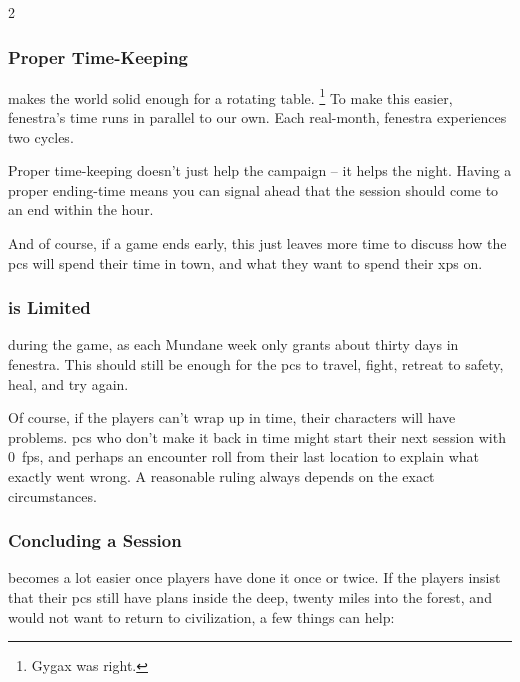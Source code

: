 \begin{multicols}{2}
\subsubsection{Proper Time-Keeping}
makes the world solid enough for a rotating table.%
\footnote{Gygax was right.}
To make this easier, \gls{fenestra}'s time runs in parallel to our own.
Each real-month, \gls{fenestra} experiences two \glspl{cycle}.

Proper time-keeping doesn't just help the \gls{campaign} -- it helps the night.
Having a proper ending-time means you can signal ahead that the session should come to an end within the hour.

And of course, if a game ends early, this just leaves more time to discuss how the \glspl{pc} will spend their time in town, and what they want to spend their \glspl{xp} on.

\subsubsection{ is Limited}
during the game, as each Mundane week only grants about thirty days in \gls{fenestra}.
This should still be enough for the \glspl{pc} to travel, fight, retreat to safety, heal, and try again.

Of course, if the players can't wrap up in time, their characters will have problems.
\Glspl{pc} who don't make it back in time might start their next session with 0~\glspl{fp}, and perhaps an encounter roll from their last location to explain what exactly went wrong.
A reasonable ruling always depends on the exact circumstances.

\subsubsection{Concluding a Session}
becomes a lot easier once players have done it once or twice.
If the players insist that their \glspl{pc} still have plans inside the \gls{deep}, twenty miles into the forest, and would not want to return to civilization, a few things can help:


\end{multicols}
